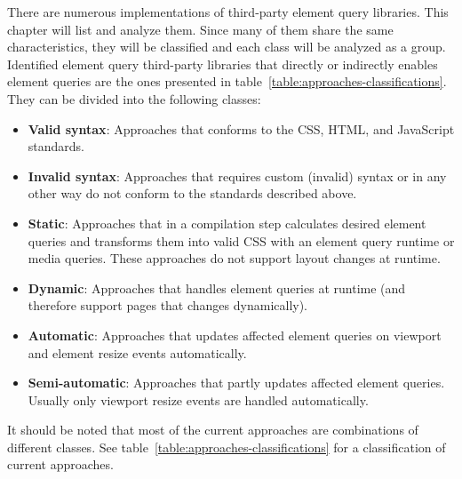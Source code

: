 \documentclass[a4paper,11pt]{kth-mag}
\begin{document}
    There are numerous implementations of third-party element query libraries. This chapter will list and analyze them.
    Since many of them share the same characteristics, they will be classified and each class will be analyzed as a group.
    Identified element query third-party libraries that directly or indirectly enables element queries are the ones presented in table~\ref{table:approaches-classifications}.
    They can be divided into the following classes:
    \begin{itemize}
      \item \textbf{Valid syntax}: Approaches that conforms to the \gls{CSS}, \gls{HTML}, and \gls{JavaScript} standards.
      \item \textbf{Invalid syntax}: Approaches that requires custom (invalid) syntax or in any other way do not conform to the standards described above.
      \item \textbf{Static}: Approaches that in a compilation step calculates desired element queries and transforms them into valid \gls{CSS} with an element query runtime or media queries. These approaches do not support layout changes at runtime.
      \item \textbf{Dynamic}: Approaches that handles element queries at runtime (and therefore support pages that changes dynamically).
      \item \textbf{Automatic}: Approaches that updates affected element queries on viewport and element resize events automatically.
      \item \textbf{Semi-automatic}: Approaches that partly updates affected element queries. Usually only viewport resize events are handled automatically.
    \end{itemize}
    It should be noted that most of the current approaches are combinations of different classes.
    See table~\ref{table:approaches-classifications} for a classification of current approaches.
\end{document}
